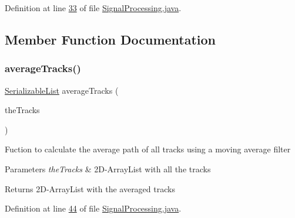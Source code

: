 Definition at line \hyperlink{_signal_processing_8java_source_l00033}{33} of file \hyperlink{_signal_processing_8java_source}{Signal\+Processing.\+java}.



\subsection{Member Function Documentation}
\hypertarget{classfunctions_1_1_signal_processing_abf1074d52caa632088bc9c8f12f8ee53}{}\label{classfunctions_1_1_signal_processing_abf1074d52caa632088bc9c8f12f8ee53} 
\subsubsection{\texorpdfstring{average\+Tracks()}{averageTracks()}}
{\footnotesize\ttfamily \hyperlink{classdata_1_1_serializable_list}{Serializable\+List} average\+Tracks (\begin{DoxyParamCaption}\item[{\hyperlink{classdata_1_1_serializable_list}{Serializable\+List}}]{the\+Tracks }\end{DoxyParamCaption})}

Fuction to calculate the average path of all tracks using a moving average filter


\begin{DoxyParams}{Parameters}
{\em the\+Tracks} & 2\+D-\/\+Array\+List with all the tracks \\
\hline
\end{DoxyParams}
\begin{DoxyReturn}{Returns}
2\+D-\/\+Array\+List with the averaged tracks 
\end{DoxyReturn}


Definition at line \hyperlink{_signal_processing_8java_source_l00044}{44} of file \hyperlink{_signal_processing_8java_source}{Signal\+Processing.\+java}.

\hypertarget{classfunctions_1_1_signal_processing_ab5068ef8536594355df9d576ba97dd57}{}\label{classfunctions_1_1_signal_processing_ab5068ef8536594355df9d576ba97dd57} 
